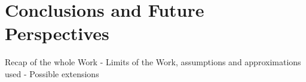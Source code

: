 \chapter{Conclusions and Future Perspectives}
 Recap of the whole Work
- Limits of the Work, assumptions and approximations used
- Possible extensions
